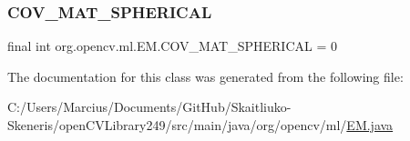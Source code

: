 \subsubsection{\texorpdfstring{C\+O\+V\+\_\+\+M\+A\+T\+\_\+\+S\+P\+H\+E\+R\+I\+C\+AL}{COV\_MAT\_SPHERICAL}}
{\footnotesize\ttfamily final int org.\+opencv.\+ml.\+E\+M.\+C\+O\+V\+\_\+\+M\+A\+T\+\_\+\+S\+P\+H\+E\+R\+I\+C\+AL = 0\hspace{0.3cm}{\ttfamily [static]}}



The documentation for this class was generated from the following file\+:\begin{DoxyCompactItemize}
\item 
C\+:/\+Users/\+Marcius/\+Documents/\+Git\+Hub/\+Skaitliuko-\/\+Skeneris/open\+C\+V\+Library249/src/main/java/org/opencv/ml/\mbox{\hyperlink{_e_m_8java}{E\+M.\+java}}\end{DoxyCompactItemize}
